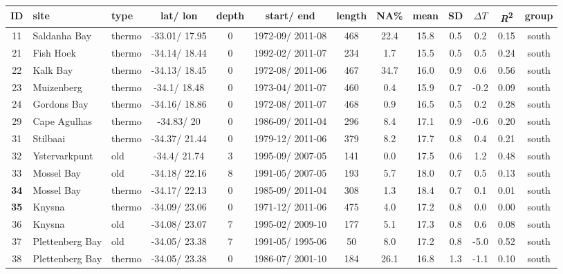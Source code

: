 \documentclass{ametsoc}
\begin{document}
\begin{table}[ht]
\label{metadata-south-table}
\centering
\tiny
\begin{tabular}{cllcccccccccc}
\hline
 ID & site & type & lat/ lon & depth & start/ end & length & NA\% & mean & SD & $\Delta T$ & \emph{R}\textsuperscript{2} & group \\ \hline
   11 & Saldanha Bay & thermo & -33.01/ 17.95 &   0 & 1972-09/ 2011-08 & 468 & 22.4 & 15.8 & 0.5 & 0.2 & 0.15 & south \\
   21 & Fish Hoek & thermo & -34.14/ 18.44 &   0 & 1992-02/ 2011-07 & 234 & 1.7 & 15.5 & 0.5 & 0.5 & 0.24 & south \\
   22 & Kalk Bay & thermo & -34.13/ 18.45 &   0 & 1972-08/ 2011-06 & 467 & 34.7 & 16.0 & 0.9 & 0.6 & 0.56 & south \\
   23 & Muizenberg & thermo & -34.1/ 18.48 &   0 & 1973-04/ 2011-07 & 460 & 0.4 & 15.9 & 0.7 & -0.2 & 0.09 & south \\
   24 & Gordons Bay & thermo & -34.16/ 18.86 &   0 & 1972-08/ 2011-07 & 468 & 0.9 & 16.5 & 0.5 & 0.2 & 0.28 & south \\
   29 & Cape Agulhas & thermo & -34.83/ 20 &   0 & 1986-09/ 2011-04 & 296 & 8.4 & 17.1 & 0.9 & -0.6 & 0.20 & south \\
   31 & Stilbaai & thermo & -34.37/ 21.44 &   0 & 1979-12/ 2011-06 & 379 & 8.2 & 17.7 & 0.8 & 0.4 & 0.21 & south \\
   32 & Ystervarkpunt & old & -34.4/ 21.74 &   3 & 1995-09/ 2007-05 & 141 & 0.0 & 17.5 & 0.6 & 1.2 & 0.48 & south \\
   33 & Mossel Bay & old & -34.18/ 22.16 &   8 & 1991-05/ 2007-05 & 193 & 5.7 & 18.0 & 0.7 & 0.5 & 0.13 & south \\
   \textbf{34} & Mossel Bay & thermo & -34.17/ 22.13 &   0 & 1985-09/ 2011-04 & 308 & 1.3 & 18.4 & 0.7 & 0.1 & 0.01 & south \\
   \textbf{35} & Knysna & thermo & -34.09/ 23.06 &   0 & 1971-12/ 2011-06 & 475 & 4.0 & 17.2 & 0.8 & 0.0 & 0.00 & south \\
   36 & Knysna & old & -34.08/ 23.07 &   7 & 1995-02/ 2009-10 & 177 & 5.1 & 17.3 & 0.8 & 0.6 & 0.08 & south \\
   37 & Plettenberg Bay & old & -34.05/ 23.38 &   7 & 1991-05/ 1995-06 &  50 & 8.0 & 17.2 & 0.8 & -5.0 & 0.52 & south \\
   38 & Plettenberg Bay & thermo & -34.05/ 23.38 &   0 & 1986-07/ 2001-10 & 184 & 26.1 & 16.8 & 1.3 & -1.1 & 0.10 & south \\

\end{tabular}
\end{table}
\end{document}
